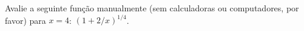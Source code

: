 Avalie a seguinte função manualmente (sem calculadoras ou computadores, por favor) para $x = 4$: $(1 + 2/x)^{1/4}$.


